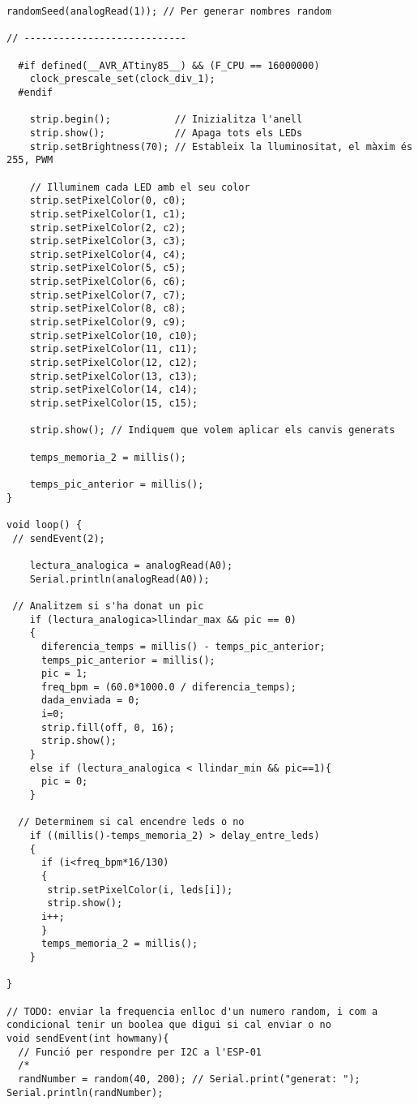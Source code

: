 \begin{lstlisting}[style=myArduino]
  randomSeed(analogRead(1)); // Per generar nombres random

// ----------------------------

  #if defined(__AVR_ATtiny85__) && (F_CPU == 16000000)
    clock_prescale_set(clock_div_1);
  #endif
  
    strip.begin();           // Inizialitza l'anell
    strip.show();            // Apaga tots els LEDs
    strip.setBrightness(70); // Estableix la lluminositat, el màxim és 255, PWM

    // Illuminem cada LED amb el seu color
    strip.setPixelColor(0, c0);
    strip.setPixelColor(1, c1);
    strip.setPixelColor(2, c2);
    strip.setPixelColor(3, c3);
    strip.setPixelColor(4, c4);
    strip.setPixelColor(5, c5);
    strip.setPixelColor(6, c6);
    strip.setPixelColor(7, c7);
    strip.setPixelColor(8, c8);
    strip.setPixelColor(9, c9);
    strip.setPixelColor(10, c10);
    strip.setPixelColor(11, c11);
    strip.setPixelColor(12, c12);
    strip.setPixelColor(13, c13);
    strip.setPixelColor(14, c14);
    strip.setPixelColor(15, c15);
      
    strip.show(); // Indiquem que volem aplicar els canvis generats

    temps_memoria_2 = millis();
    
    temps_pic_anterior = millis();
}

void loop() {
 // sendEvent(2);
 
    lectura_analogica = analogRead(A0);
    Serial.println(analogRead(A0));
    
 // Analitzem si s'ha donat un pic
    if (lectura_analogica>llindar_max && pic == 0)
    {
      diferencia_temps = millis() - temps_pic_anterior;
      temps_pic_anterior = millis();
      pic = 1;
      freq_bpm = (60.0*1000.0 / diferencia_temps);
      dada_enviada = 0;
      i=0;
      strip.fill(off, 0, 16);
      strip.show();
    }
    else if (lectura_analogica < llindar_min && pic==1){
      pic = 0;
    }

  // Determinem si cal encendre leds o no
    if ((millis()-temps_memoria_2) > delay_entre_leds)
    {
      if (i<freq_bpm*16/130)
      {
       strip.setPixelColor(i, leds[i]);
       strip.show();
      i++;      
      }
      temps_memoria_2 = millis();
    }

}

// TODO: enviar la frequencia enlloc d'un numero random, i com a condicional tenir un boolea que digui si cal enviar o no
void sendEvent(int howmany){
  // Funció per respondre per I2C a l'ESP-01
  /*
  randNumber = random(40, 200); // Serial.print("generat: "); Serial.println(randNumber);
  

\end{lstlisting}
